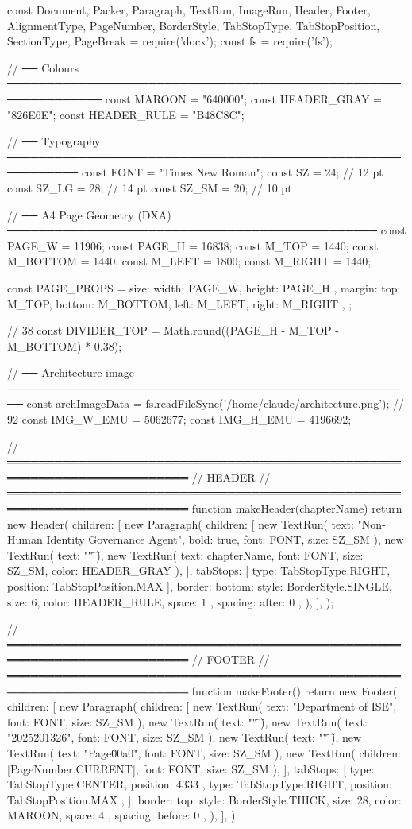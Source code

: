 const {
  Document, Packer, Paragraph, TextRun, ImageRun, Header, Footer,
  AlignmentType, PageNumber, BorderStyle, TabStopType,
  TabStopPosition, SectionType, PageBreak
} = require('docx');
const fs = require('fs');

// ── Colours ──────────────────────────────────────────────────────────────
const MAROON      = "640000";
const HEADER_GRAY = "826E6E";
const HEADER_RULE = "B48C8C";

// ── Typography ───────────────────────────────────────────────────────────
const FONT  = "Times New Roman";
const SZ    = 24;   // 12 pt
const SZ_LG = 28;   // 14 pt
const SZ_SM = 20;   // 10 pt

// ── A4 Page Geometry (DXA) ───────────────────────────────────────────────
const PAGE_W   = 11906;
const PAGE_H   = 16838;
const M_TOP    = 1440;
const M_BOTTOM = 1440;
const M_LEFT   = 1800;
const M_RIGHT  = 1440;

const PAGE_PROPS = {
  size:   { width: PAGE_W, height: PAGE_H },
  margin: { top: M_TOP, bottom: M_BOTTOM, left: M_LEFT, right: M_RIGHT },
};

// 38%
const DIVIDER_TOP = Math.round((PAGE_H - M_TOP - M_BOTTOM) * 0.38);

// ── Architecture image ────────────────────────────────────────────────────
const archImageData = fs.readFileSync('/home/claude/architecture.png');
// 92%
const IMG_W_EMU = 5062677;
const IMG_H_EMU = 4196692;

// ═════════════════════════════════════════════════════════════════════════
//  HEADER
// ═════════════════════════════════════════════════════════════════════════
function makeHeader(chapterName) {
  return new Header({
    children: [
      new Paragraph({
        children: [
          new TextRun({ text: "Non-Human Identity Governance Agent", bold: true, font: FONT, size: SZ_SM }),
          new TextRun({ text: "\t" }),
          new TextRun({ text: chapterName, font: FONT, size: SZ_SM, color: HEADER_GRAY }),
        ],
        tabStops: [{ type: TabStopType.RIGHT, position: TabStopPosition.MAX }],
        border: { bottom: { style: BorderStyle.SINGLE, size: 6, color: HEADER_RULE, space: 1 } },
        spacing: { after: 0 },
      }),
    ],
  });
}

// ═════════════════════════════════════════════════════════════════════════
//  FOOTER
// ═════════════════════════════════════════════════════════════════════════
function makeFooter() {
  return new Footer({
    children: [
      new Paragraph({
        children: [
          new TextRun({ text: "Department of ISE", font: FONT, size: SZ_SM }),
          new TextRun({ text: "\t" }),
          new TextRun({ text: "2025\u201326", font: FONT, size: SZ_SM }),
          new TextRun({ text: "\t" }),
          new TextRun({ text: "Page\u00a0", font: FONT, size: SZ_SM }),
          new TextRun({ children: [PageNumber.CURRENT], font: FONT, size: SZ_SM }),
        ],
        tabStops: [
          { type: TabStopType.CENTER, position: 4333 },
          { type: TabStopType.RIGHT,  position: TabStopPosition.MAX },
        ],
        border: { top: { style: BorderStyle.THICK, size: 28, color: MAROON, space: 4 } },
        spacing: { before: 0 },
      }),
    ],
  });
}

